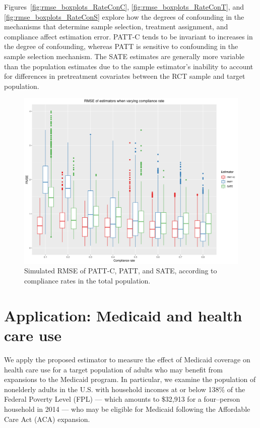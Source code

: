\documentclass[hidelinks,12pt]{article}
\begin{document}
{{Figures~\ref{fig:rmse_boxplots_RateConC}, \ref{fig:rmse_boxplots_RateConT}, and \ref{fig:rmse_boxplots_RateConS} explore how the degrees of confounding in the mechanisms that determine sample selection, treatment assignment, and compliance affect estimation error. PATT-C tends to be invariant to increases in the degree of confounding, whereas PATT is sensitive to confounding in the sample selection mechanism. The SATE estimates are generally more variable than the population estimates due to the sample estimator's inability to account for differences in pretreatment covariates between the RCT sample and target population. }
%

\begin{figure}[htbp]
\begin{center}
\includegraphics[width = 1\textwidth]{rmse_boxplots_rateC}
\caption{Simulated RMSE of PATT-C, PATT, and SATE, according to compliance rates in the total population.\label{fig:rmse_boxplots_rateC}}
\end{center}
\end{figure}

\section{Application: Medicaid and health care use} \label{application}

We apply the proposed estimator to measure the effect of Medicaid coverage on health care use for a target population of adults who may benefit from expansions to the Medicaid program. In particular, we examine the population of nonelderly adults in the U.S. with household incomes at or below 138\% of the Federal Poverty Level (FPL) --- which amounts to \$32,913 for a four--person household in 2014 --- who may be eligible for Medicaid following the Affordable Care Act (ACA) expansion.

}
\end{document}
